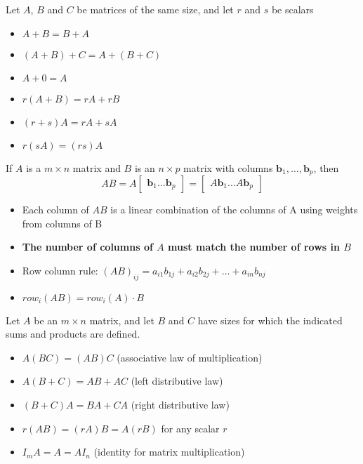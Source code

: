 \documentclass{report}
\begin{document}
\setcounter{theorem}{0}
\setcounter{definition}{0}
\begin{theorem}
\end{theorem}
\begin{tcolorbox}[colback=blue!5!white, colframe=blue!75!black, title=Properties of Matrices]
Let $A$, $B$ and $C$ be matrices of the same size, and let $r$ and $s$ be scalars
\begin{itemize}
    \item $A + B = B + A$
    \item $(A + B) + C = A + (B + C)$
    \item $A + 0 = A$
    \item $r(A + B) = rA + rB$
    \item $(r + s)A = rA + sA$
    \item $r(sA) = (rs)A$
\end{itemize}
\end{tcolorbox}

\begin{definition}
    If $A$ is a $m \times n$ matrix and $B$ is an $n \times p$ matrix with columns
$\mathbf{b}_1, \ldots, \mathbf{b}_p$, then 
\[
AB = A\begin{bmatrix}\mathbf{b}_1 \ldots \mathbf{b}_p\end{bmatrix}
    = \begin{bmatrix}A\mathbf{b}_1 \ldots A\mathbf{b}_p\end{bmatrix}
\]
\end{definition}

\begin{itemize}
\item Each column of $AB$ is a linear combination of the columns of A using weights from columns of B
\item \textbf{The number of columns of $A$ must match the number of rows in $B$ }
\item Row column rule: $(AB)_{ij} = a_{i1}b_{1j} + a_{i2}b_{2j} + \ldots + a_{in}b_{nj}$
\item $row_i(AB) = row_i(A)\cdot B$
\end{itemize}

\begin{theorem}
\end{theorem}
\begin{tcolorbox}[colback=blue!5!white, colframe=blue!75!black, title=Properties of Matrices]
Let $A$ be an $m \times n$ matrix, and let $B$ and $C$ have sizes for which the indicated sums and products are defined.

\begin{itemize}
    \item[] $A(BC) = (AB)C$ \hfill (associative law of multiplication)
    \item[] $A(B + C) = AB + AC$ \hfill (left distributive law)
    \item[] $(B + C)A = BA + CA$ \hfill (right distributive law)
    \item[] $r(AB) = (rA)B = A(rB)$ for any scalar $r$
    \item[] $I_m A = A = A I_n$ \hfill (identity for matrix multiplication)
\end{itemize}
\end{tcolorbox}
\end{document}
